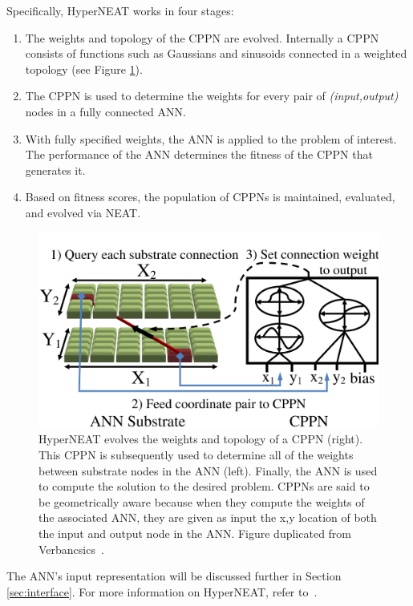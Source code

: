 \documentclass{sig-alternate}
\begin{document}
Specifically, HyperNEAT works in four stages:

\begin{enumerate}
\item The weights and topology of the CPPN are evolved. Internally a CPPN consists of functions such as Gaussians and sinusoids connected in a weighted topology (see Figure \ref{fig:cppn}).
\item The CPPN is used to determine the weights for every pair of \emph{(input,output)} nodes in a fully connected ANN.
\item With fully specified weights, the ANN is applied to the problem of interest. The performance of the ANN determines the fitness of the CPPN that generates it.
\item Based on fitness scores, the population of CPPNs is maintained, evaluated, and evolved via NEAT.
\end{enumerate}

\begin{figure}[htp]
\begin{center}
\includegraphics[width=\columnwidth]{figures/cppn}
\end{center}
\caption{HyperNEAT evolves the weights and topology of a CPPN (right). This CPPN is subsequently used to determine all of the weights between substrate nodes in the ANN (left). Finally, the ANN is used to compute the solution to the desired problem. CPPNs are said to be geometrically aware because when they compute the weights of the associated ANN, they are given as input the x,y location of both the input and output node in the ANN. Figure duplicated from Verbancsics~\cite{verbancsics10}.}
\label{fig:cppn}
\end{figure}

The ANN's input representation will be discussed further in Section \ref{sec:interface}. For more information on HyperNEAT, refer to~\cite{gauci08}.
\end{document}
